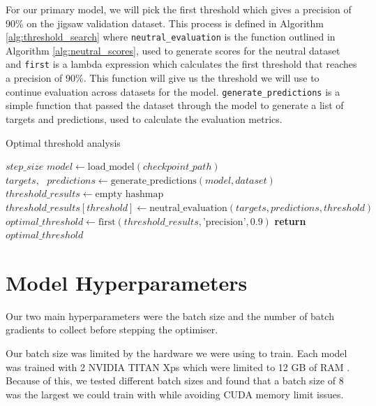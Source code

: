 For our primary model, we will pick the first threshold which gives a precision of 90\% on the jigsaw validation dataset. This process is defined in Algorithm \ref{alg:threshold_search} where \verb|neutral_evaluation| is the function outlined in Algorithm \ref{alg:neutral_scores}, used to generate scores for the neutral dataset and \verb|first| is a lambda expression which calculates the first threshold that reaches a precision of 90\%. This function will give us the threshold we will use to continue evaluation across datasets for the model. \verb|generate_predictions| is a simple function that passed the dataset through the model to generate a list of targets and predictions, used to calculate the evaluation metrics.

\begin{algorithm}[H]
    \caption{Optimal threshold analysis}
    \begin{algorithmic}[1]
        \Require $step\_size$
        \State $model \gets \text{load\_model}(checkpoint\_path)$
        \State $targets,\text{ }predictions \gets \text{generate\_predictions}(model, dataset)$
        \State
        \State $threshold\_results \gets \text{empty hashmap}$
        \State $threshold\_results[threshold] \gets \text{neutral\_evaluation}(targets, predictions, threshold)$
        \EndFor
        \State $optimal\_threshold \gets \text{first}(threshold\_results, \text{'precision'}, 0.9) $
        \State
        \State \textbf{return} $optimal\_threshold$
        \EndFunction
    \end{algorithmic}
    \label{alg:threshold_search}
\end{algorithm}

\section{Model Hyperparameters}

Our two main hyperparameters were the batch size and the number of batch gradients to collect before stepping the optimiser.

Our batch size was limited by the hardware we were using to train. Each model was trained with 2 NVIDIA TITAN Xps which were limited to 12 GB of RAM \cite{nvidia-titan-xp}. Because of this, we tested different batch sizes and found that a batch size of 8 was the largest we could train with while avoiding CUDA memory limit issues.

